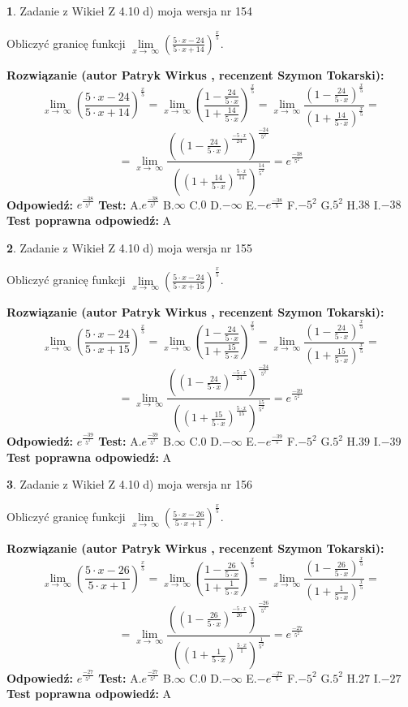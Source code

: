 \documentclass[12pt, a4paper]{article}
\theoremstyle{definition} %
\newtheorem{zad}{}
\newcommand{\zadStart}[1]{\begin{zad}#1\newline}
\newcommand{\zadStop}{\end{zad}}
\newcommand{\rozwStart}[2]{\noindent \textbf{Rozwiązanie (autor #1 , recenzent #2): }\newline}
\newcommand{\rozwStop}{\newline}
\newcommand{\odpStart}{\noindent \textbf{Odpowiedź:}\newline}
\newcommand{\odpStop}{\newline}
\newcommand{\testStart}{\noindent \textbf{Test:}\newline}
\newcommand{\testStop}{\newline}
\newcommand{\kluczStart}{\noindent \textbf{Test poprawna odpowiedź:}\newline}
\newcommand{\kluczStop}{\newline}
\begin{document}
\zadStart{Zadanie z Wikieł Z 4.10 d) moja wersja nr 154}


Obliczyć granicę funkcji  $\lim\limits_{x\to\ \infty}(\frac{5\cdot x-24}{5\cdot x+14})^{\frac{x}{5}}$.
\zadStop
\rozwStart{Patryk Wirkus}{Szymon Tokarski}
$$\lim\limits_{x\to\ \infty}(\frac{5\cdot x-24}{5\cdot x+14})^{\frac{x}{5}} = \lim\limits_{x\to\ \infty}(\frac{1-\frac{24}{5\cdot x}}{1+\frac{14}{5\cdot x}})^{\frac{x}{5}}=\lim\limits_{x\to\ \infty}\frac{(1-\frac{24}{5\cdot x})^{\frac{x}{5}}}{(1+\frac{14}{5\cdot x})^{\frac{x}{5}}}=$$
$$=\lim\limits_{x\to\ \infty}\frac{((1-\frac{24}{5\cdot x})^{\frac{-5\cdot x}{24}})^{\frac{-24}{5^{2}}}}{((1+\frac{14}{5\cdot x})^{\frac{5\cdot x}{14}})^{\frac{14}{5^{2}}}}=e^{\frac{-38}{5^{2}}}$$
\rozwStop
\odpStart
$e^{\frac{-38}{5^{2}}}$
\odpStop
\testStart
A.$e^{\frac{-38}{5^{2}}}$ B.$\infty$ C.$0$ D.$-\infty$ E.$-e^{\frac{-38}{5}}$
F.$-5^{2}$ G.$5^{2}$
H.$38$
I.$-38$
\testStop
\kluczStart
A
\kluczStop



\zadStart{Zadanie z Wikieł Z 4.10 d) moja wersja nr 155}


Obliczyć granicę funkcji  $\lim\limits_{x\to\ \infty}(\frac{5\cdot x-24}{5\cdot x+15})^{\frac{x}{5}}$.
\zadStop
\rozwStart{Patryk Wirkus}{Szymon Tokarski}
$$\lim\limits_{x\to\ \infty}(\frac{5\cdot x-24}{5\cdot x+15})^{\frac{x}{5}} = \lim\limits_{x\to\ \infty}(\frac{1-\frac{24}{5\cdot x}}{1+\frac{15}{5\cdot x}})^{\frac{x}{5}}=\lim\limits_{x\to\ \infty}\frac{(1-\frac{24}{5\cdot x})^{\frac{x}{5}}}{(1+\frac{15}{5\cdot x})^{\frac{x}{5}}}=$$
$$=\lim\limits_{x\to\ \infty}\frac{((1-\frac{24}{5\cdot x})^{\frac{-5\cdot x}{24}})^{\frac{-24}{5^{2}}}}{((1+\frac{15}{5\cdot x})^{\frac{5\cdot x}{15}})^{\frac{15}{5^{2}}}}=e^{\frac{-39}{5^{2}}}$$
\rozwStop
\odpStart
$e^{\frac{-39}{5^{2}}}$
\odpStop
\testStart
A.$e^{\frac{-39}{5^{2}}}$ B.$\infty$ C.$0$ D.$-\infty$ E.$-e^{\frac{-39}{5}}$
F.$-5^{2}$ G.$5^{2}$
H.$39$
I.$-39$
\testStop
\kluczStart
A
\kluczStop



\zadStart{Zadanie z Wikieł Z 4.10 d) moja wersja nr 156}


Obliczyć granicę funkcji  $\lim\limits_{x\to\ \infty}(\frac{5\cdot x-26}{5\cdot x+1})^{\frac{x}{5}}$.
\zadStop
\rozwStart{Patryk Wirkus}{Szymon Tokarski}
$$\lim\limits_{x\to\ \infty}(\frac{5\cdot x-26}{5\cdot x+1})^{\frac{x}{5}} = \lim\limits_{x\to\ \infty}(\frac{1-\frac{26}{5\cdot x}}{1+\frac{1}{5\cdot x}})^{\frac{x}{5}}=\lim\limits_{x\to\ \infty}\frac{(1-\frac{26}{5\cdot x})^{\frac{x}{5}}}{(1+\frac{1}{5\cdot x})^{\frac{x}{5}}}=$$
$$=\lim\limits_{x\to\ \infty}\frac{((1-\frac{26}{5\cdot x})^{\frac{-5\cdot x}{26}})^{\frac{-26}{5^{2}}}}{((1+\frac{1}{5\cdot x})^{\frac{5\cdot x}{1}})^{\frac{1}{5^{2}}}}=e^{\frac{-27}{5^{2}}}$$
\rozwStop
\odpStart
$e^{\frac{-27}{5^{2}}}$
\odpStop
\testStart
A.$e^{\frac{-27}{5^{2}}}$ B.$\infty$ C.$0$ D.$-\infty$ E.$-e^{\frac{-27}{5}}$
F.$-5^{2}$ G.$5^{2}$
H.$27$
I.$-27$
\testStop
\kluczStart
A
\kluczStop
\end{document}
